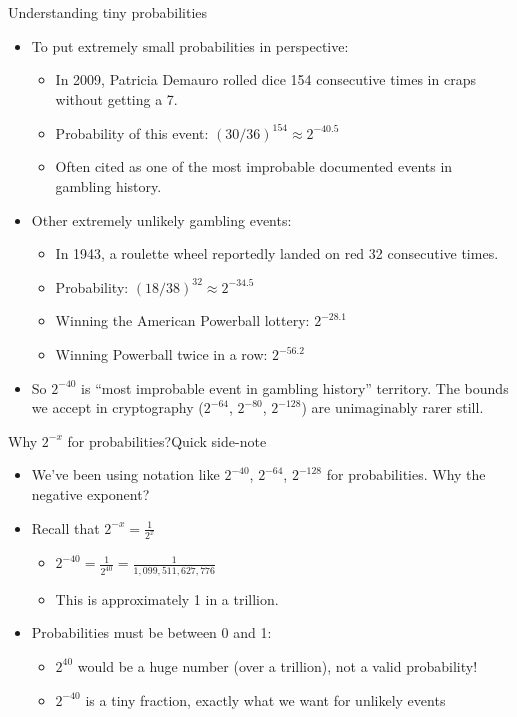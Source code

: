 \ifdefined\PRESENTATION\else\PassOptionsToClass{handout}{beamer}\fi\documentclass[aspectratio=169, lualatex]{beamer}
\begin{document}
\begin{frame}{Understanding tiny probabilities}
	\begin{itemize}
		\item To put extremely small probabilities in perspective:
		      \begin{itemize}
			      \item In 2009, Patricia Demauro rolled dice 154 consecutive times in craps without getting a 7.
			      \item Probability of this event: $(30/36)^{154} \approx 2^{-40.5}$
			      \item Often cited as one of the most improbable documented events in gambling history.
		      \end{itemize}
		\item Other extremely unlikely gambling events:
		      \begin{itemize}
			      \item In 1943, a roulette wheel reportedly landed on red 32 consecutive times.
			      \item Probability: $(18/38)^{32} \approx 2^{-34.5}$
			      \item Winning the American Powerball lottery: $2^{-28.1}$
			      \item Winning Powerball twice in a row: $2^{-56.2}$
		      \end{itemize}
		\item So $2^{-40}$ is ``most improbable event in gambling history'' territory. The bounds we accept in cryptography ($2^{-64}$, $2^{-80}$, $2^{-128}$) are unimaginably rarer still.
	\end{itemize}
\end{frame}

\begin{frame}{Why $2^{-x}$ for probabilities?}{Quick side-note}
	\begin{itemize}
		\item We've been using notation like $2^{-40}$, $2^{-64}$, $2^{-128}$ for probabilities. Why the negative exponent?
		\item Recall that $2^{-x} = \frac{1}{2^x}$
		      \begin{itemize}
			      \item $2^{-40} = \frac{1}{2^{40}} = \frac{1}{1{,}099{,}511{,}627{,}776}$
			      \item This is approximately 1 in a trillion.
		      \end{itemize}
		\item Probabilities must be between 0 and 1:
		      \begin{itemize}
			      \item $2^{40}$ would be a huge number (over a trillion), not a valid probability!
			      \item $2^{-40}$ is a tiny fraction, exactly what we want for unlikely events
		      \end{itemize}
	\end{itemize}
\end{frame}
\end{document}
